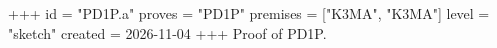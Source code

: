 +++
id = "PD1P.a"
proves = "PD1P"
premises = ["K3MA", "K3MA"]
level = "sketch"
created = 2026-11-04
+++
Proof of PD1P.

